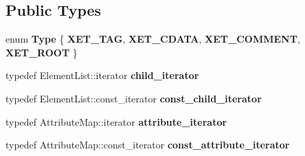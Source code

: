 \subsection*{Public Types}
\begin{DoxyCompactItemize}
\item 
enum {\bfseries Type} \{ {\bfseries X\+E\+T\+\_\+\+T\+AG}, 
{\bfseries X\+E\+T\+\_\+\+C\+D\+A\+TA}, 
{\bfseries X\+E\+T\+\_\+\+C\+O\+M\+M\+E\+NT}, 
{\bfseries X\+E\+T\+\_\+\+R\+O\+OT}
 \}\hypertarget{classXMLDOM_1_1XMLElement_a2275d5868dfcd311aedaf1f1cec76adc}{}\label{classXMLDOM_1_1XMLElement_a2275d5868dfcd311aedaf1f1cec76adc}

\item 
typedef Element\+List\+::iterator {\bfseries child\+\_\+iterator}\hypertarget{classXMLDOM_1_1XMLElement_a81b6054337bcea45449019ca3acaf49a}{}\label{classXMLDOM_1_1XMLElement_a81b6054337bcea45449019ca3acaf49a}

\item 
typedef Element\+List\+::const\+\_\+iterator {\bfseries const\+\_\+child\+\_\+iterator}\hypertarget{classXMLDOM_1_1XMLElement_a67f3c6e6dcdb1bb378cece31afa051f7}{}\label{classXMLDOM_1_1XMLElement_a67f3c6e6dcdb1bb378cece31afa051f7}

\item 
typedef Attribute\+Map\+::iterator {\bfseries attribute\+\_\+iterator}\hypertarget{classXMLDOM_1_1XMLElement_a445a314ef98c6723023003384f63ac82}{}\label{classXMLDOM_1_1XMLElement_a445a314ef98c6723023003384f63ac82}

\item 
typedef Attribute\+Map\+::const\+\_\+iterator {\bfseries const\+\_\+attribute\+\_\+iterator}\hypertarget{classXMLDOM_1_1XMLElement_afa0d0e4c025551993d05b5148c51f121}{}\label{classXMLDOM_1_1XMLElement_afa0d0e4c025551993d05b5148c51f121}

\end{DoxyCompactItemize}

